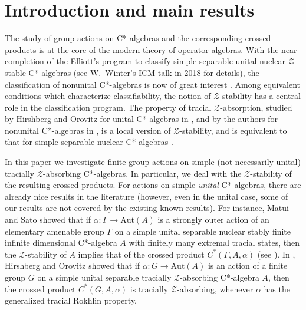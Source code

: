 \documentclass[11pt]{amsart}
\theoremstyle{plain}
\theoremstyle{definition}
\theoremstyle{remark}
\numberwithin{equation}{section}
\begin{document}
\maketitle
\tableofcontents
\section{Introduction and main results}\label{sec_intro}
%



The study of group actions on C*-algebras  and 
the corresponding crossed products is at the core of 
 the modern theory of operator algebras.
With the near completion of the Elliott's program
to classify simple separable unital nuclear $\mathcal{Z}$-stable
C*-algebras   (see W.~Winter's ICM talk in 2018 
\cite{Winter2018} for details),
the classification of nonunital C*-algebras is now of great
interest \cite{GngLin, GngLinII, GngLinIII, EGLN17}. Among equivalent conditions which characterize classifiability, the
notion of $\mathcal{Z}$-stability has a central role in the classification program.
The  property of tracial $\mathcal{Z}$-absorption, studied by Hirshberg and
Orovitz for unital C*-algebras in \cite{HO13}, and by the authors 
for nonunital C*-algebras in \cite{AGJP21}, is a 
local version of $\mathcal{Z}$-stability, and is
equivalent to that for simple separable nuclear
C*-algebras \cite{HO13, CLS2021}.

\medskip

In this paper we investigate finite group actions on
simple (not necessarily unital) tracially 
$\mathcal{Z}$-absorbing C*-algebras.
In particular, we deal with the $\mathcal{Z}$-stability of 
the resulting crossed products. For actions on 
simple \emph{unital} C*-algebras, there are already nice results
in the literature
(however, even in the unital case, some of our results 
are not covered by the existing known results).
For instance, Matui and Sato 
showed that if 
$\alpha \colon \Gamma \to \mathrm{Aut} (A)$
is a strongly outer action of an elementary amenable group $\Gamma$
on a  simple unital separable  nuclear stably finite
infinite dimensional C*-algebra $A$ with finitely many
extremal tracial states, then the $\mathcal{Z}$-stability
of $A$ implies that of the crossed product
$C^* (\Gamma, A,\alpha)$ (see \cite[Corollary~4.11]{MS2014}).
In \cite[Theorem~5.6]{HO13}, Hirshberg and Orovitz
showed that if  $\alpha \colon G \to \mathrm{Aut} (A)$ is an
action of a finite group $G$ on a simple unital separable
tracially $\mathcal{Z}$-absorbing
C*-algebra $A$, then
the crossed product $C^*(G, A,\alpha)$ is tracially
$\mathcal{Z}$-absorbing, whenever 
$\alpha$ has  the generalized tracial Rokhlin
property. 
\end{document}
